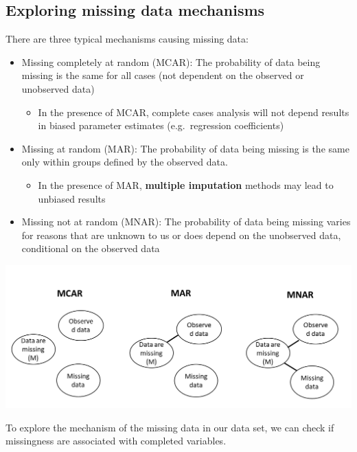 \documentclass[
]{article}
\providecommand{\tightlist}{%
  \setlength{\itemsep}{0pt}\setlength{\parskip}{0pt}}
\begin{document}
\hypertarget{exploring-missing-data-mechanisms}{%
\subsection{Exploring missing data
mechanisms}\label{exploring-missing-data-mechanisms}}

There are three typical mechanisms causing missing data:

\begin{itemize}
\tightlist
\item
  Missing completely at random (MCAR): The probability of data being
  missing is the same for all cases (not dependent on the observed or
  unobserved data)

  \begin{itemize}
  \tightlist
  \item
    In the presence of MCAR, complete cases analysis will not depend
    results in biased parameter estimates (e.g.~regression coefficients)
  \end{itemize}
\item
  Missing at random (MAR): The probability of data being missing is the
  same only within groups defined by the observed data.

  \begin{itemize}
  \tightlist
  \item
    In the presence of MAR, \textbf{multiple imputation} methods may
    lead to unbiased results
  \end{itemize}
\item
  Missing not at random (MNAR): The probability of data being missing
  varies for reasons that are unknown to us or does depend on the
  unobserved data, conditional on the observed data
\end{itemize}

\includegraphics{images/Types of missing data.png}

To explore the mechanism of the missing data in our data set, we can
check if missingness are associated with completed variables.
\end{document}

